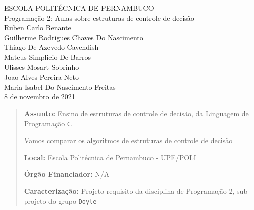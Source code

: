 \documentclass[a4paper,12pt]{article}  %
\begin{document}

\begin{center}
    \vspace{-30mm}
    \LARGE{ESCOLA POLITÉCNICA DE PERNAMBUCO}
    \vspace{10mm}
    \\ \LARGE{Programação 2:
Aulas sobre estruturas de controle de decisão}
    \vspace{30mm}
    \\ \large{Ruben Carlo Benante \\ Guilherme Rodrigues Chaves Do Nascimento \\ Thiago De Azevedo
Cavendish \\ Mateus Simplicio De Barros \\ Ulisses Mosart Sobrinho \\ Joao Alves Pereira Neto \\ Maria Isabel Do Nascimento Freitas}
    \vspace{60mm}
    \\ \large{8 de novembro de 2021}
\end{center}


\newpage

\begin{abstract}

\textbf{Assunto:} Ensino de estruturas de controle de decisão, da Linguagem de Programação \texttt{C}.

 Vamos comparar os algoritmos de estruturas de controle de decisão %

\textbf{Local:} Escola Politécnica de Pernambuco - UPE/POLI

\textbf{Órgão Financiador:} N/A

\textbf{Caracterização:} Projeto requisito da disciplina de Programação 2, sub-projeto do grupo \texttt{Doyle}

\end{abstract}


\newpage

\tableofcontents


\end{document}
